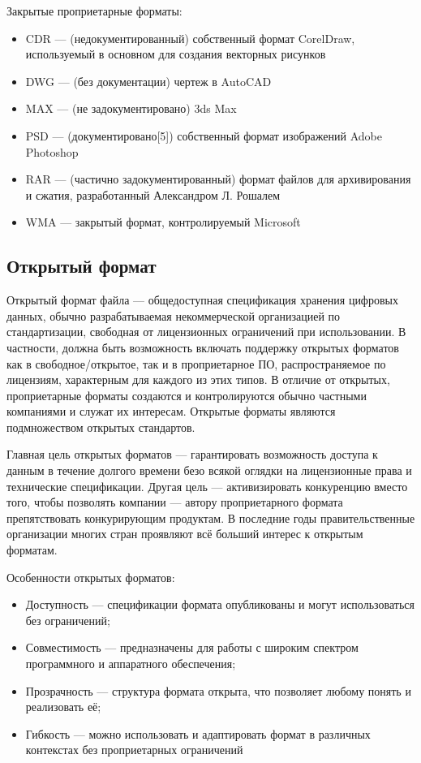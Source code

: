 \documentclass{ou}
\begin{document}
Закрытые проприетарные форматы:
\begin{itemize}
    \item CDR — (недокументированный) собственный формат CorelDraw, используемый в основном для создания векторных рисунков
    \item DWG — (без документации) чертеж в AutoCAD
    \item MAX — (не задокументировано) 3ds Max
    \item PSD — (документировано[5]) собственный формат изображений Adobe Photoshop
    \item RAR — (частично задокументированный) формат файлов для архивирования и сжатия, разработанный Александром Л. Рошалем
    \item WMA — закрытый формат, контролируемый Microsoft
\end{itemize}
\newpage
\subsection{Открытый формат}
Открытый формат файла — общедоступная спецификация хранения цифровых данных, обычно разрабатываемая некоммерческой организацией по стандартизации, свободная от лицензионных ограничений при использовании. В частности, должна быть возможность включать поддержку открытых форматов как в свободное/открытое, так и в проприетарное ПО, распространяемое по лицензиям, характерным для каждого из этих типов. В отличие от открытых, проприетарные форматы создаются и контролируются обычно частными компаниями и служат их интересам. Открытые форматы являются подмножеством открытых стандартов.

Главная цель открытых форматов — гарантировать возможность доступа к данным в течение долгого времени безо всякой оглядки на лицензионные права и технические спецификации. Другая цель — активизировать конкуренцию вместо того, чтобы позволять компании — автору проприетарного формата препятствовать конкурирующим продуктам. В последние годы правительственные организации многих стран проявляют всё больший интерес к открытым форматам.

Особенности открытых форматов:
\begin{itemize}
    \item Доступность — спецификации формата опубликованы и могут использоваться без ограничений;
    \item Совместимость — предназначены для работы с широким спектром программного и аппаратного обеспечения;
    \item Прозрачность — структура формата открыта, что позволяет любому понять и реализовать её;
    \item Гибкость — можно использовать и адаптировать формат в различных контекстах без проприетарных ограничений
\end{itemize}
\end{document}
